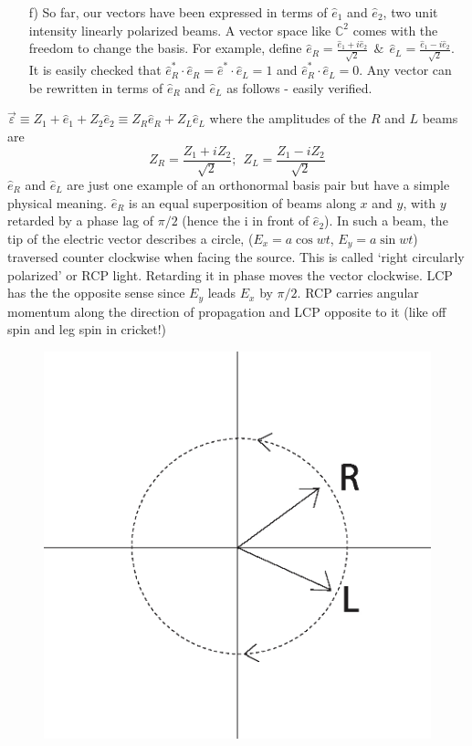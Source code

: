 \begin{itemize}
\item[f)] So far, our vectors have been expressed in terms of $\hat{e}_1$ and $\hat{e}_2$, two unit intensity
linearly polarized beams. A vector space like $\mathbb{C}^2$ comes with the freedom to
change the basis. For example, define $\hat{e}_R = \frac{\hat{e}_1 + i \hat{e}_2}{\sqrt{2}} ~~\&~~ \hat{e}_L = \frac{\hat{e}_1 - i \hat{e}_2}{\sqrt{2}}$. It is easily
checked that $\hat{e}^{\ast}_R  \cdot \hat{e}_R = \hat{e}^{\ast} \cdot \hat{e}_L = 1$ and $\hat{e}^{\ast}_R \cdot \hat{e}_L = 0$. Any vector can be rewritten
in terms of $\hat{e}_R$ and $\hat{e}_L$ as follows - easily verified.
\end{itemize}
$\overrightarrow{\varepsilon} \equiv Z_1 + \hat{e}_1 + Z_2 \hat{e}_2  \equiv Z_R \hat{e}_R + Z_L \hat{e}_L$ where the amplitudes of the $R$ and $L$ beams are 
$$
Z_R  = \dfrac{Z_1 + iZ_2}{\sqrt{2}} ; ~~ Z_L = \dfrac{Z_1 - iZ_2}{\sqrt{2}}
$$
$\hat{e}_R$ and $\hat{e}_L$ are just one example of an orthonormal basis pair but have a simple
physical meaning. $\hat{e}_R$ is an equal superposition of beams along $x$ and $y$, with
$y$ retarded by a phase lag of $\pi/2$ (hence the i in front of $\hat{e}_2$). In such a beam,
the tip of the electric vector describes a circle, ($E_x = a \cos wt$, $E_y = a \sin wt$)
traversed counter clockwise when facing the source. This is called `right circularly polarized' or RCP light. Retarding it in phase moves the vector clockwise.
LCP has the the opposite sense since $E_y$ leads $E_x$ by $\pi/2$. RCP carries angular
momentum along the direction of propagation and LCP opposite to it (like off
spin and leg spin in cricket!)
\begin{figure}[H]
\centering
\includegraphics[scale=0.22]{src/images/chap26/2.jpg}
\end{figure}

